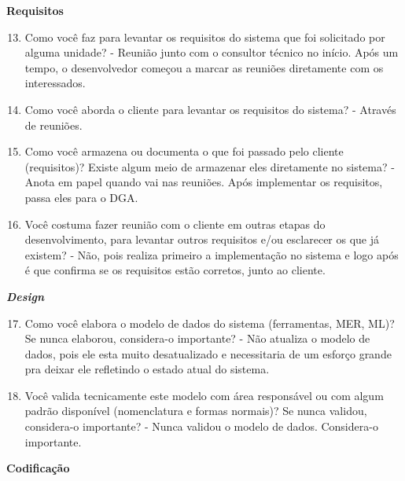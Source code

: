 \begin{apendicesenv}
\textbf{Requisitos}

\begin{enumerate}
	\setcounter{enumi}{12}
	\item Como você faz para levantar os requisitos do sistema que foi solicitado por alguma
	unidade?\newline
	- Reunião junto com o consultor técnico no início. Após um tempo, o desenvolvedor começou a marcar as reuniões diretamente com os interessados.
	\item Como você aborda o cliente para levantar os requisitos do sistema?\newline
	- Através de reuniões.
	\item Como você armazena ou documenta o que foi passado pelo cliente (requisitos)? Existe
	algum meio de armazenar eles diretamente no sistema?\newline
	- Anota em papel quando vai nas reuniões. Após implementar os requisitos, passa eles para o DGA.
	\item Você costuma fazer reunião com o cliente em outras etapas do desenvolvimento, para
	levantar outros requisitos e/ou esclarecer os que já existem?\newline
	- Não, pois realiza primeiro a implementação no sistema e logo após é que confirma se os requisitos estão corretos, junto ao cliente.
\end{enumerate}

\textbf{\textit{Design}}

\begin{enumerate}
	\setcounter{enumi}{16}
	\item Como você elabora o modelo de dados do sistema (ferramentas, MER, ML)? Se nunca
	elaborou, considera-o importante?\newline
	- Não atualiza o modelo de dados, pois ele esta muito desatualizado e necessitaria de um esforço grande pra deixar ele refletindo o estado atual do sistema.
	\item Você valida tecnicamente este modelo com área responsável ou com algum padrão
	disponível (nomenclatura e formas normais)? Se nunca validou, considera-o importante?\newline
	- Nunca validou o modelo de dados. Considera-o importante.
\end{enumerate}

\textbf{Codificação}


\end{apendicesenv}
